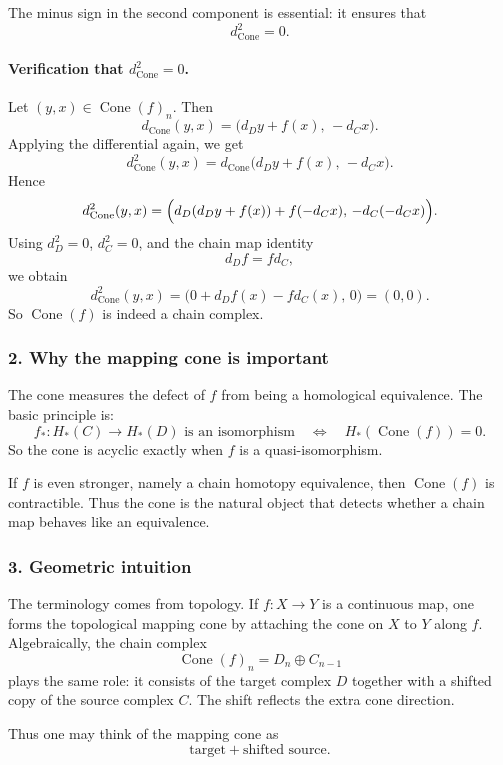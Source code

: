\documentclass[12pt,a4paper]{article}
\theoremstyle{notespace}
\begin{document}
The minus sign in the second component is essential: it ensures that
\[
d_{\operatorname{Cone}}^2=0.
\]

\paragraph{Verification that \(d_{\operatorname{Cone}}^2=0\).}
Let \((y,x)\in \operatorname{Cone}(f)_n\). Then
\[
d_{\operatorname{Cone}}(y,x)=\bigl(d_D y+f(x),\,-d_C x\bigr).
\]
Applying the differential again, we get
\[
d_{\operatorname{Cone}}^2(y,x)
=
d_{\operatorname{Cone}}\bigl(d_D y+f(x),\,-d_C x\bigr).
\]
Hence
\[
d_{\operatorname{Cone}}^2(y,x)
=
\Bigl(d_D(d_D y+f(x))+f(-d_C x),\,-d_C(-d_C x)\Bigr).
\]
Using \(d_D^2=0\), \(d_C^2=0\), and the chain map identity
\[
d_D f=f d_C,
\]
we obtain
\[
d_{\operatorname{Cone}}^2(y,x)
=
\bigl(0+d_D f(x)-f d_C(x),\,0\bigr)
=
(0,0).
\]
So \(\operatorname{Cone}(f)\) is indeed a chain complex.

\subsubsection*{2. Why the mapping cone is important}

The cone measures the defect of \(f\) from being a homological equivalence. The basic principle is:
\[
f_*:H_*(C)\to H_*(D)\text{ is an isomorphism}
\quad\Longleftrightarrow\quad
H_*(\operatorname{Cone}(f))=0.
\]
So the cone is acyclic exactly when \(f\) is a quasi-isomorphism.

If \(f\) is even stronger, namely a chain homotopy equivalence, then \(\operatorname{Cone}(f)\) is contractible. Thus the cone is the natural object that detects whether a chain map behaves like an equivalence.

\subsubsection*{3. Geometric intuition}

The terminology comes from topology. If \(f:X\to Y\) is a continuous map, one forms the topological mapping cone by attaching the cone on \(X\) to \(Y\) along \(f\). Algebraically, the chain complex
\[
\operatorname{Cone}(f)_n=D_n\oplus C_{n-1}
\]
plays the same role: it consists of the target complex \(D\) together with a shifted copy of the source complex \(C\). The shift reflects the extra cone direction.

Thus one may think of the mapping cone as
\[
\text{target} + \text{shifted source}.
\]
\end{document}
